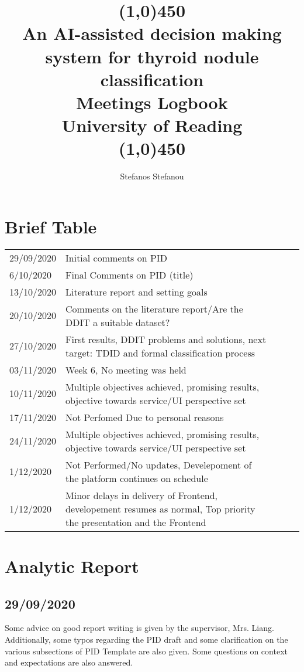 \documentclass[openany]{article}
\title{\line(1,0){450}\\An AI-assisted decision making system for thyroid nodule classification \\ Meetings Logbook \\ \footnotesize University of Reading  \\\line(1,0){450}}
\author{Stefanos Stefanou}
\begin{document}
	\maketitle
	\section{Brief Table}
		\begin{table}[H]
			\begin{tabular}{lllll}
				29/09/2020 & Initial comments on PID &  &  &  \\
				6/10/2020  & Final Comments on PID (title)&  &  &  \\
				13/10/2020 & Literature report and setting goals&  &  &  \\
				20/10/2020 & Comments on the literature report/Are the DDIT a suitable dataset?&  &  &  \\
				27/10/2020 & First results, DDIT problems and solutions, next target: TDID and formal classification process&  &  &  \\
				03/11/2020 & Week 6, No meeting was held&  &  &  \\
				10/11/2020 & Multiple objectives achieved, promising results, objective towards service/UI perspective set&  &  &  \\
				17/11/2020 & Not Perfomed Due to personal reasons&  &  &  \\
				24/11/2020 & Multiple objectives achieved, promising results, objective towards service/UI perspective set&  &  &  \\				
				1/12/2020  & Not Performed/No updates, Develepoment of the platform continues on schedule&  &  &  \\				
				1/12/2020  & Minor delays in delivery of Frontend, developement resumes as normal, Top priority the presentation and the Frontend&  &  &  \\				
				
			\end{tabular}
		\end{table}
	\section{Analytic Report}
		\subsection{29/09/2020}
			Some advice on good report writing is given by the supervisor, Mrs. Liang. Additionally, some typos regarding the PID draft and some clarification on the various subsections of PID Template are also given. Some questions on context and expectations are also answered.
\end{document}
